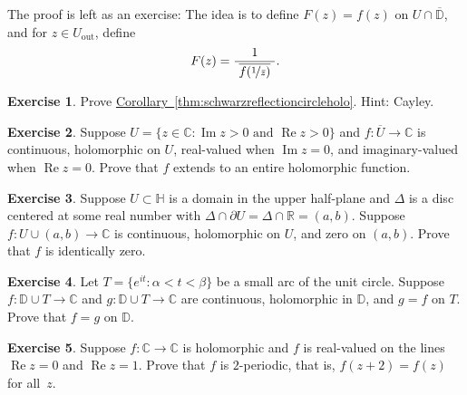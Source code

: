 \documentclass[12pt,openany]{book}
\newcommand{\widebar}[1]{\overline{#1}}
\renewcommand{\Re}{\operatorname{Re}}
\renewcommand{\Im}{\operatorname{Im}}
\newcommand{\C}{{\mathbb{C}}}
\newcommand{\R}{{\mathbb{R}}}
\newcommand{\D}{{\mathbb{D}}}
\newcommand{\bH}{{\mathbb{H}}}
\theoremstyle{plain}
\theoremstyle{remark}
\theoremstyle{definition}
\newenvironment{exbox}{%
    \def\FrameCommand{\vrule width 1pt \relax\hspace{10pt}}%
    \MakeFramed{\advance\hsize-\width\FrameRestore}%
}{%
    \endMakeFramed
}
\theoremstyle{exercise}
\newtheorem{exercise}{Exercise}[section]
\theoremstyle{example}
\newcommand{\corref}[1]{\hyperref[#1]{Corollary~\ref*{#1}}}
\begin{document}
The proof is left as an exercise: The idea is to define
$F(z) = f(z)$ on $U \cap \overline{\D}$, and for $z \in U_{\text{out}}$, define
\begin{equation*}
F(z) = \frac{1}{~\overline{f(\nicefrac{1}{\bar{z}})}~} .
\end{equation*}

\begin{exbox}
\begin{exercise}
Prove \corref{thm:schwarzreflectioncircleholo}.  Hint: Cayley.
\end{exercise}

\begin{exercise}
Suppose $U = \{ z \in \C : \Im z > 0 \text{ and } \Re z > 0 \}$
and $f \colon \widebar{U} \to \C$ is continuous, holomorphic 
on $U$, real-valued when $\Im z =0$, and imaginary-valued
when $\Re z = 0$.  Prove that $f$ extends to an entire holomorphic function.
\end{exercise}

\begin{exercise}
Suppose $U \subset \bH$ is a domain in the upper half-plane
and $\Delta$ is a disc centered at some real number
with $\Delta \cap \partial U = \Delta \cap \R = (a,b)$.
Suppose $f \colon U \cup (a,b) \to \C$ is continuous, holomorphic on $U$,
and zero on $(a,b)$.  Prove that $f$ is identically zero.
\end{exercise}

\begin{exercise}
Let $T = \{ e^{it} : \alpha < t < \beta \}$ be a small arc of the unit
circle.  Suppose $f \colon \D \cup T \to \C$ and $g \colon \D \cup T \to \C$
are continuous, holomorphic in $\D$, and $g = f$ on $T$.  Prove that
$f=g$ on $\D$.
\end{exercise}

\begin{exercise}
Suppose $f \colon \C \to \C$ is holomorphic and $f$ is real-valued
on the lines $\Re z = 0$ and $\Re z = 1$.  Prove that $f$ is
$2$-periodic, that is, $f(z+2) = f(z)$ for all~$z$.
\end{exercise}


\end{exbox}
\end{document}
